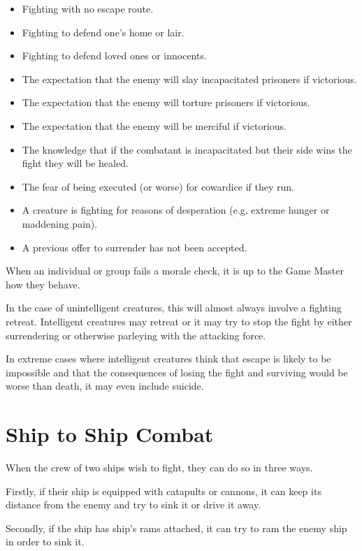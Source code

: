 \begin{multicols*}{2}
\begin{itemize}
	\item{Fighting with no escape route.}
	\item{Fighting to defend one’s home or lair.}
	\item{Fighting to defend loved ones or innocents.}
	\item{The expectation that the enemy will slay incapacitated prisoners if victorious.}
	\item{The expectation that the enemy will torture prisoners if victorious.}
	\item{The expectation that the enemy will be merciful if victorious.}
	\item{The knowledge that if the combatant is incapacitated but their side wins the fight they will be healed.}
	\item{The fear of being executed (or worse) for cowardice if they run.}
	\item{A creature is fighting for reasons of desperation (e.g. extreme hunger or maddening pain).}
	\item{A previous offer to surrender has not been accepted.}
\end{itemize}

When an individual or group fails a morale check, it is up to the Game Master how they behave.

In the case of unintelligent creatures, this will almost always involve a fighting retreat. Intelligent creatures may retreat or it may try to stop the fight by either surrendering or otherwise parleying with the attacking force.

In extreme cases where intelligent creatures think that escape is likely to be impossible and that the consequences of losing the fight and surviving would be worse than death, it may even include suicide.

\section{Ship to Ship Combat}\label{sec:Ship to Ship Combat}
When the crew of two ships wish to fight, they can do so in three ways.

Firstly, if their ship is equipped with catapults or cannons, it can keep its distance from the enemy and try to sink it or drive it away.

Secondly, if the ship has ship’s rams attached, it can try to ram the enemy ship in order to sink it.


\end{multicols*}
